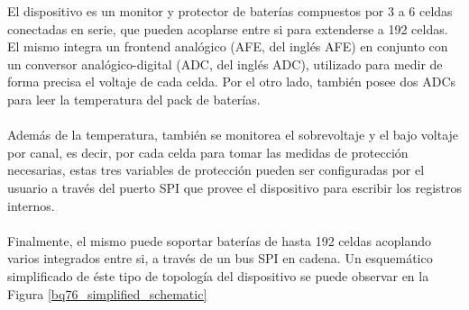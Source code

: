 \documentclass[10pt, a4paper]{article}
\begin{document}
\begin{minipage}{0.5\textwidth}
El dispositivo es un monitor y protector de bater\'ias compuestos por 3 a 6
celdas conectadas en serie, que pueden acoplarse entre si para extenderse a 192
celdas. El mismo integra un frontend anal\'ogico (\acrshort{AFE}, del ingl\'es
\acrlong{AFE}) en conjunto con un conversor anal\'ogico-digital (\acrshort{ADC},
del ingl\'es \acrlong{ADC}), utilizado para medir de forma precisa el voltaje de
cada celda. Por el otro lado, tambi\'en posee dos \acrshort{ADC}s para leer la
temperatura del pack de bater\'ias.\\
\\
Adem\'as de la temperatura, tambi\'en  se monitorea el sobrevoltaje y el bajo
voltaje por canal, es decir, por cada celda para tomar las medidas de
protecci\'on necesarias, estas tres variables de protecci\'on pueden ser
configuradas por el usuario a trav\'es del puerto SPI que provee el dispositivo
para escribir los registros internos.\\
\\
Finalmente, el mismo puede soportar bater\'ias de hasta 192 celdas acoplando
varios integrados entre si, a trav\'es de un bus SPI en cadena. Un esquem\'atico
simplificado de \'este tipo de topolog\'ia del dispositivo se puede observar en
la Figura \ref{bq76_simplified_schematic}

\end{minipage}
\end{document}
